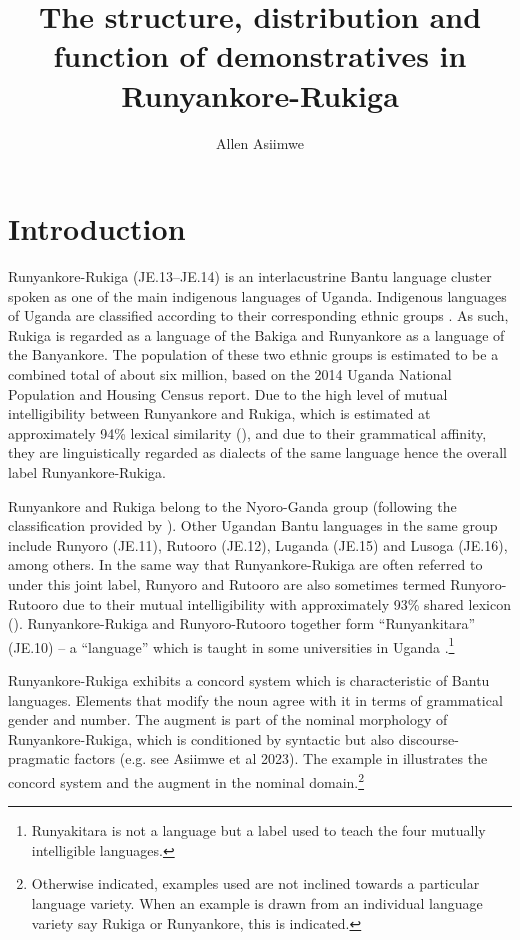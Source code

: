 \documentclass[output=paper 		  ]{langscibook}
\author{Allen Asiimwe\orcid{0000-0003-1906-519X}\affiliation{Makerere University, Uganda}}
\title[Demonstratives in Run\-yan\-ko\-re-Ru\-ki\-ga]{The structure, distribution and function of demonstratives in Run\-yan\-ko\-re-Ru\-ki\-ga}
\begin{document}
\maketitle


\section{Introduction}\label{sec:asiimwe:1}

Run\-yan\-ko\-re-Ru\-ki\-ga (JE.13–JE.14) is an interlacustrine Bantu language cluster spoken as one of the main indigenous languages of Uganda. Indigenous languages of Uganda are classified according to their corresponding ethnic groups \citep{SimonsFennig2017}. As such, Rukiga is regarded as a language of the Bakiga and Runyankore as a language of the Banyankore. The population of these two ethnic groups is estimated to be a combined total of about six million, based on the 2014 Uganda National Population and Housing Census report. Due to the high level of mutual intelligibility between Runyankore and Rukiga, which is estimated at approximately 94\% lexical similarity (\citealt{LadefogedEtAl1972, SimonsFennig2017}), and due to their grammatical affinity, they are linguistically regarded as dialects of the same language hence the overall label Run\-yan\-ko\-re-Ru\-ki\-ga.

\begin{sloppypar}
Runyankore and Rukiga belong to the Nyoro-Ganda group (following the classification provided by \citealt{Maho2009}). Other Ugandan Bantu languages in the same group include Runyoro (JE.11), Rutooro (JE.12), Luganda (JE.15) and Lusoga (JE.16), among others. In the same way that Run\-yan\-ko\-re-Ru\-ki\-ga are often referred to under this joint label, Runyoro and Rutooro are also sometimes termed Runyoro-Rutooro due to their mutual intelligibility with approximately 93\% shared lexicon (\citealt{LadefogedEtAl1972, LewisEtAl2013}). Run\-yan\-ko\-re-Ru\-ki\-ga and Runyoro-Rutooro together form ``Runyankitara'' (JE.10) -- a ``language'' which is taught in some universities in Uganda \citep{Bernsten1998}.\footnote{Runyakitara is not a language but a label used to teach the four mutually intelligible languages.}
\end{sloppypar}

Run\-yan\-ko\-re-Ru\-ki\-ga exhibits a concord system which is characteristic of Bantu languages. Elements that modify the noun agree with it in terms of grammatical gender and number. The augment is part of the nominal morphology of Run\-yan\-ko\-re-Ru\-ki\-ga, which is conditioned by syntactic but also dis\-course-prag\-mat\-ic factors (e.g. see Asiimwe et al 2023). The example in  illustrates the concord system and the augment in the nominal domain.\footnote{Otherwise indicated, examples used are not inclined towards a particular language variety. When an example is drawn from an individual language variety say Rukiga or Runyankore, this is indicated.}
\end{document}

